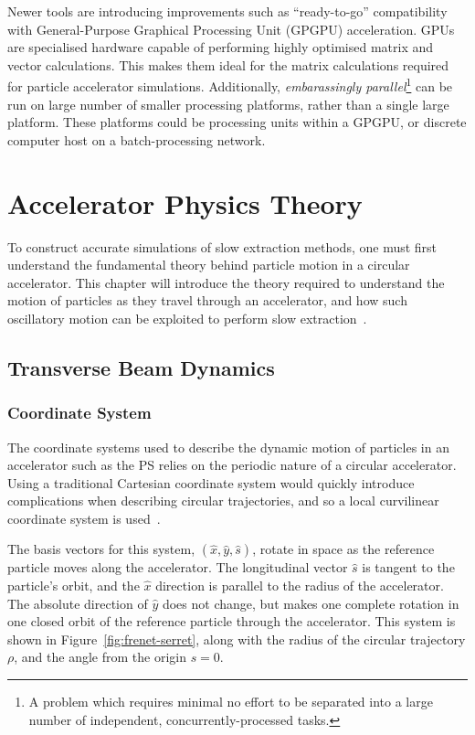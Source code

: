 \documentclass[11pt]{report}
\begin{document}
Newer tools are introducing improvements such as ``ready-to-go'' compatibility with General-Purpose Graphical Processing Unit (GPGPU) acceleration. GPUs are specialised hardware capable of performing highly optimised matrix and vector calculations. This makes them ideal for the matrix calculations required for particle accelerator simulations. Additionally, \textit{embarassingly parallel}\footnote{A problem which requires minimal no effort to be separated into a large number of independent, concurrently-processed tasks.} can be run on large number of smaller processing platforms, rather than a single large platform. These platforms could be processing units within a GPGPU, or discrete computer host on a batch-processing network.

\chapter{Accelerator Physics Theory}\label{chap:theory}

To construct accurate simulations of slow extraction methods, one must first understand the fundamental theory behind particle motion in a circular accelerator. This chapter will introduce the theory required to understand the motion of particles as they travel through an accelerator, and how such oscillatory motion can be exploited to perform slow extraction~\cite{Wiedemann}.
\section{Transverse Beam Dynamics}\label{sec:theory-transverse}

\subsection{Coordinate System}

The coordinate systems used to describe the dynamic motion of particles in an accelerator such as the PS relies on the periodic nature of a circular accelerator. Using a traditional Cartesian coordinate system would quickly introduce complications when describing circular trajectories, and so a local curvilinear coordinate system is used~\cite{BDSIM}.

The basis vectors for this system, $(\hat x, \hat y, \hat s)$, rotate in space as the reference particle moves along the accelerator. The longitudinal vector $\hat s$ is tangent to the particle's orbit, and the $\hat x$ direction is parallel to the radius of the accelerator. The absolute direction of $\hat y$ does not change, but makes one complete rotation in one closed orbit of the reference particle through the accelerator. This system is shown in Figure~\ref{fig:frenet-serret}, along with the radius of the circular trajectory $\rho$, and the angle from the origin $s=0$. 
\end{document}
